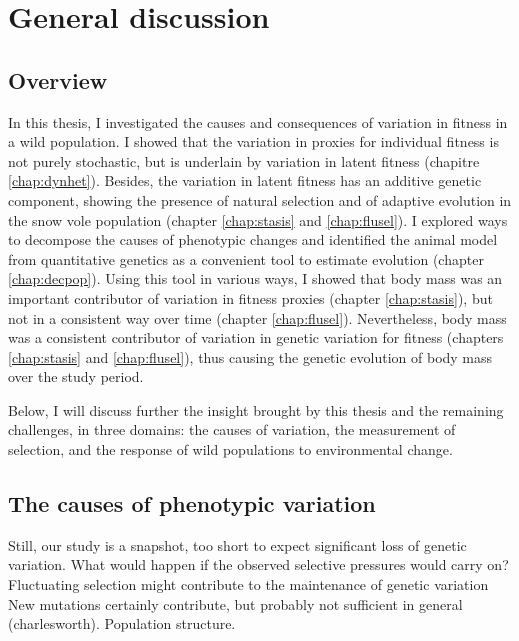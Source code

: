 
\chapter[\texorpdfstring{Chapter 6 \\ General discussion}{Chapter 6 General discussion}]{General discussion}
\label{chap:discu}

\section{Overview}
In this thesis, I investigated the causes and consequences of variation in fitness in a wild population. I showed that the variation in proxies for individual fitness is not purely stochastic, but is underlain by variation in latent fitness (chapitre \ref{chap:dynhet}). Besides, the variation in latent fitness has an additive genetic component, showing the presence of natural selection and of adaptive evolution in the snow vole population (chapter \ref{chap:stasis} and \ref{chap:flusel}).
I explored ways to decompose the causes of phenotypic changes and identified the animal model from quantitative genetics as a convenient tool to estimate evolution (chapter \ref{chap:decpop}).
Using this tool in various ways, I showed that body mass was an important contributor of variation in fitness proxies (chapter \ref{chap:stasis}), but not in a consistent way over time (chapter \ref{chap:flusel}). Nevertheless, body mass was a consistent contributor of variation in genetic variation for fitness (chapters \ref{chap:stasis} and \ref{chap:flusel}), thus causing the genetic evolution of body mass over the study period.

Below, I will discuss further the insight brought by this thesis and the remaining challenges, in three domains: the causes of variation, the measurement of selection, and the response of wild populations to environmental change. 

\section{The causes of phenotypic variation}


Still, our study is a snapshot, too short to expect significant loss of genetic variation. What would happen if the observed selective pressures would carry on? 
Fluctuating selection might contribute to the maintenance of genetic variation
New mutations certainly contribute, but probably not sufficient in general (charlesworth).
Population structure. 

